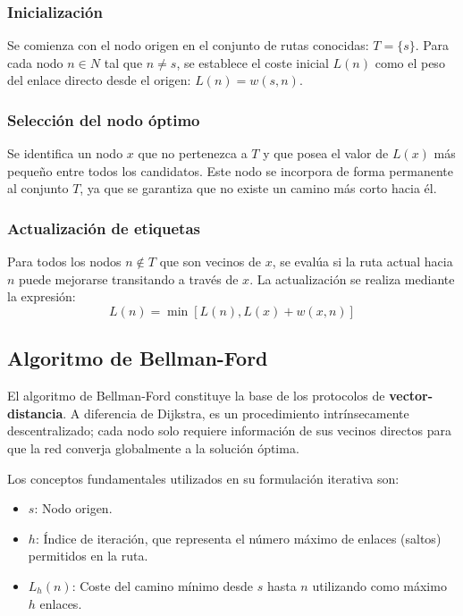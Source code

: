 \subsubsection{Inicialización}

Se comienza con el nodo origen en el conjunto de rutas conocidas: $T = \{s\}$. Para cada nodo $n \in N$ tal que $n \neq s$, se establece el coste inicial $L(n)$ como el peso del enlace directo desde el origen: $L(n) = w(s,n)$.

\subsubsection{Selección del nodo óptimo}

Se identifica un nodo $x$ que no pertenezca a $T$ y que posea el valor de $L(x)$ más pequeño entre todos los candidatos. Este nodo se incorpora de forma permanente al conjunto $T$, ya que se garantiza que no existe un camino más corto hacia él.

\subsubsection{Actualización de etiquetas}

Para todos los nodos $n \notin T$ que son vecinos de $x$, se evalúa si la ruta actual hacia $n$ puede mejorarse transitando a través de $x$. La actualización se realiza mediante la expresión: 
\[ L(n) = \min[L(n), L(x) + w(x,n)] \]

\subsection{Algoritmo de Bellman-Ford}

El algoritmo de Bellman-Ford constituye la base de los protocolos de \textbf{vector-distancia}. A diferencia de Dijkstra, es un procedimiento intrínsecamente descentralizado; cada nodo solo requiere información de sus vecinos directos para que la red converja globalmente a la solución óptima.

Los conceptos fundamentales utilizados en su formulación iterativa son:

\begin{itemize}
	\item $s$: Nodo origen.
	\item $h$: Índice de iteración, que representa el número máximo de enlaces (saltos) permitidos en la ruta.
	\item $L_h(n)$: Coste del camino mínimo desde $s$ hasta $n$ utilizando como máximo $h$ enlaces.
\end{itemize}

